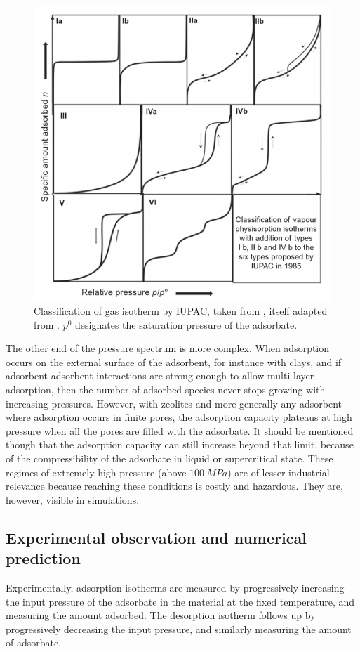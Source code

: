 \documentclass[main.tex]{subfiles}
\begin{document}
\begin{figure}[t]
	\centering
	\includegraphics[width=0.6\columnwidth]{figures/database/IsothermTypes.png}
	\caption{Classification of gas isotherm by IUPAC, taken from \cite{Rouquerol2013}, itself adapted from \cite{IUPAC1985}. $p^0$ designates the saturation pressure of the adsorbate.}\label{fig:IUPACisotherms}
\end{figure}

The other end of the pressure spectrum is more complex. When adsorption occurs on the external surface of the adsorbent, for instance with clays, and if adsorbent-adsorbent interactions are strong enough to allow multi-layer adsorption, then the number of adsorbed species never stops growing with increasing pressures. However, with zeolites and more generally any adsorbent where adsorption occurs in finite pores, the adsorption capacity plateaus at high pressure when all the pores are filled with the adsorbate. It should be mentioned though that the adsorption capacity can still increase beyond that limit, because of the compressibility of the adsorbate in liquid or supercritical state. These regimes of extremely high pressure (above $\qty{100}{MPa}$) are of lesser industrial relevance because reaching these conditions is costly and hazardous. They are, however, visible in simulations.

\subsection{Experimental observation and numerical prediction}

\label{experimentalisotherm}

Experimentally, adsorption isotherms are measured by progressively increasing the input pressure of the adsorbate in the material at the fixed temperature, and measuring the amount adsorbed. The desorption isotherm follows up by progressively decreasing the input pressure, and similarly measuring the amount of adsorbate.
\end{document}
